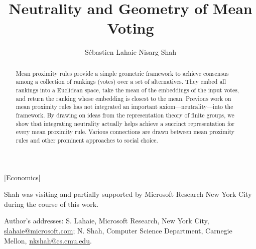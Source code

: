 \documentclass[prodmode]{acmsmall-ec14}
\begin{document}

\title{Neutrality and Geometry of Mean Voting}
\author{
S\'{e}bastien Lahaie
Nisarg Shah
}

\begin{abstract}
Mean proximity rules provide a simple geometric framework to achieve consensus among a collection of rankings (votes) over a set of alternatives. They embed all rankings into a Euclidean space, take the mean of the embeddings of the input votes, and return the ranking whose embedding is closest to the mean. Previous work on mean proximity rules has not integrated an important axiom---neutrality---into the framework. By drawing on ideas from the representation theory of finite groups, we show that integrating neutrality actually helps achieve a succinct representation for every mean proximity rule. Various connections are drawn between mean proximity rules and other prominent approaches to social choice.
\end{abstract}

[Economics]




\begin{bottomstuff}
Shah was visiting and partially supported by Microsoft Research New York City during the course of this work.

Author's addresses:  S. Lahaie, Microsoft Research, New York City, \url{slahaie@microsoft.com}; N. Shah, Computer Science Department, Carnegie Mellon, \url{nkshah@cs.cmu.edu}.
\end{bottomstuff}

\maketitle
\end{document}
